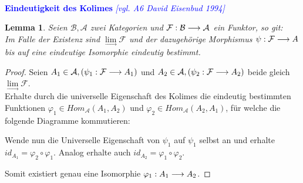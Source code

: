 \documentclass[10pt,a4paper]{report}
\newcommand{\comment}[1]{}
\newcommand{\ModulsOfDifferenzials}{David Eisenbud 1994}
\newcounter{Aussage}[chapter]
\newtheorem{lemma}[Aussage]{Lemma}
\newcommand{\functionfront}[3]{\nolinebreak{#1:#2 \longrightarrow #3}}
\newcommand{\colimes}[0]{\lim\limits_{ \longrightarrow }}
\begin{document}
\ \\
\textcolor{blue}{\textbf{Eindeutigkeit des Kolimes} \textit{[vgl. A6 \ModulsOfDifferenzials]}}
\begin{lemma}\comment{\label{Eindeutigkeit des Kolimes}}
Seien $\mathcal{B},\mathcal{A}$ zwei Kategorien und $\functionfront{\mathcal{F}}{\mathcal{B}}{\mathcal{A}}$ ein Funktor, so git:\\ 
Im Falle der Existenz sind $\colimes \mathcal{F}$ und der dazugehörige Morphismus $\functionfront{\psi}{\mathcal{F}}{A}$ bis auf eine eindeutige Isomorphie eindeutig bestimmt.
\end{lemma}
\begin{proof}
Seien $A_1 \in \mathcal{A}, (\functionfront{\psi_1}{\mathcal{F}}{A_1}) $ und $A_2 \in \mathcal{A} , (\functionfront{\psi_2}{\mathcal{F}}{A_2}) $ beide gleich $\colimes \mathcal{F}$.\\
Erhalte durch die universelle Eigenschaft des Kolimes die eindeutig bestimmten Funktionen $\varphi_1 \in Hom_{\mathcal{A}}(A_1,A_2)$ und $\varphi_2 \in Hom_{\mathcal{A}}(A_2,A_1)$, für welche die folgende Diagramme kommutieren:

\comment{$\functionfront{\varphi_1}{\mathcal{A}_1}{\mathcal{A}_2}$ und $\functionfront{\varphi_2}{\mathcal{A}_2}{\mathcal{A}_1}$}
\begin{center}
\end{center}
\begin{flushleft}
Wende nun die Universelle Eigenschaft von $\psi_1$ auf $\psi_1$ selbst an und erhalte $id_{A_1} = \varphi_2 \circ \varphi_1$. Analog erhalte auch $id_{A_2} = \varphi_1 \circ \varphi_2$.
\end{flushleft}
\begin{center}
\end{center}
Somit existiert genau eine Isomorphie $\functionfront{\varphi_1}{A_1}{A_2}$.
\end{proof}
\end{document}

